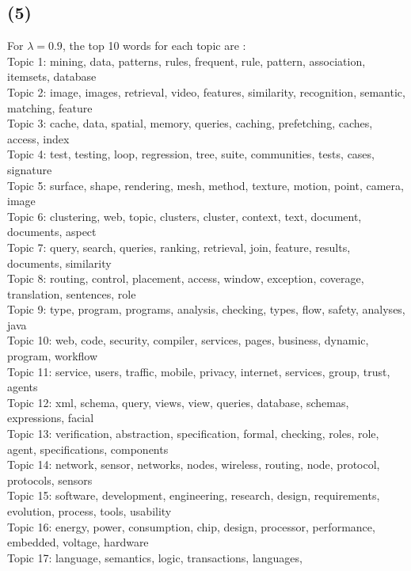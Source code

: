 \subsection*{(5)}
For $\lambda = 0.9$, the top 10 words for each topic are : \\
Topic 1: mining,
data,
patterns,
rules,
frequent,
rule,
pattern,
association,
itemsets,
database
\\
Topic 2:
image,
images,
retrieval,
video,
features,
similarity,
recognition,
semantic,
matching,
feature
\\
Topic 3:
cache,
data,
spatial,
memory,
queries,
caching,
prefetching,
caches,
access,
index
\\
Topic 4:
test,
testing,
loop,
regression,
tree,
suite,
communities,
tests,
cases,
signature
\\
Topic 5:
surface,
shape,
rendering,
mesh,
method,
texture,
motion,
point,
camera,
image
\\
Topic 6:
clustering,
web,
topic,
clusters,
cluster,
context,
text,
document,
documents,
aspect
\\
Topic 7:
query,
search,
queries,
ranking,
retrieval,
join,
feature,
results,
documents,
similarity
\\
Topic 8:
routing,
control,
placement,
access,
window,
exception,
coverage,
translation,
sentences,
role
\\
Topic 9:
type,
program,
programs,
analysis,
checking,
types,
flow,
safety,
analyses,
java
\\
Topic 10:
web,
code,
security,
compiler,
services,
pages,
business,
dynamic,
program,
workflow
\\
Topic 11:
service,
users,
traffic,
mobile,
privacy,
internet,
services,
group,
trust,
agents
\\
Topic 12:
xml,
schema,
query,
views,
view,
queries,
database,
schemas,
expressions,
facial
\\
Topic 13:
verification,
abstraction,
specification,
formal,
checking,
roles,
role,
agent,
specifications,
components
\\
Topic 14:
network,
sensor,
networks,
nodes,
wireless,
routing,
node,
protocol,
protocols,
sensors
\\
Topic 15:
software,
development,
engineering,
research,
design,
requirements,
evolution,
process,
tools,
usability
\\
Topic 16:
energy,
power,
consumption,
chip,
design,
processor,
performance,
embedded,
voltage,
hardware
\\
Topic 17:
language,
semantics,
logic,
transactions,
languages,
